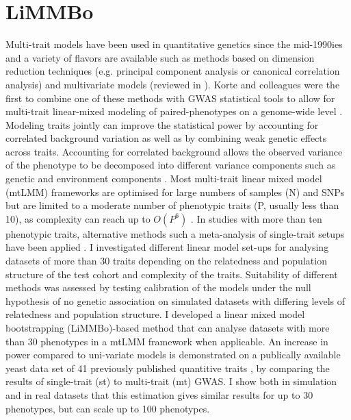 \chapter{LiMMBo}
\label{chapter:limmbo}
Multi-trait models have been used in quantitative genetics since the mid-1990ies \citep{Jiang1995} and a variety of flavors are available such as methods based on dimension reduction techniques (e.g. principal component analysis or canonical correlation analysis) and multivariate models (reviewed in \citep{Shriner2012}). Korte and colleagues were the first to combine one of these methods with GWAS statistical tools to allow for multi-trait linear-mixed modeling of paired-phenotypes on a genome-wide level \citeyearpar{Korte2012}. Modeling traits jointly can improve the statistical power by accounting for correlated background variation as well as by combining weak genetic effects across traits. Accounting for correlated background allows the observed variance of the phenotype to be decomposed into different variance components such as genetic and environment components \citep{Korte2012}. Most multi-trait linear mixed model (mtLMM) frameworks are optimised for large numbers of samples (N) and SNPs but are limited to a moderate number of phenotypic traits (P, usually less than 10), as complexity can reach up to \(O(P^6)\) \citep{Zhou2014,Casale2015}.  In studies with more than ten phenotypic traits, alternative methods such a meta-analysis of single-trait setups have been applied \citep{Bolormaa2014}. I investigated different linear model set-ups for analysing datasets of more than 30 traits depending on the relatedness and population structure of the test cohort and complexity of the traits. Suitability of different methods was assessed by testing calibration of the models under the null hypothesis of no genetic association on simulated datasets with differing levels of relatedness and population structure. I developed a linear mixed model bootstrapping (LiMMBo)-based method that can analyse datasets with more than 30 phenotypes in a mtLMM framework when applicable. An increase in power compared to uni-variate models is demonstrated on a publically available yeast data set of 41 previously published quantitive traits \citep{Bloom2013}, by comparing the results of single-trait (st) to multi-trait (mt) GWAS. I show both in simulation and in real datasets that this estimation gives similar results for up to 30 phenotypes, but can scale up to 100 phenotypes.


